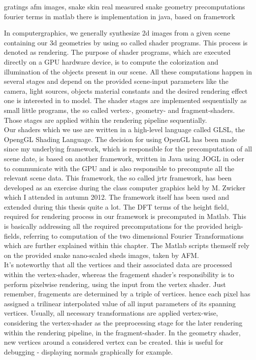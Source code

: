 gratings afm images, snake skin
real measured snake geometry
precomputations fourier terms in matlab
there is implementation in java, based on framework

















In computergraphics, we generally synthesize 2d images from a given scene containing our 3d geometries by using so called shader programs. This process is denoted as rendering. The purpose of shader programs, which are executed directly on a GPU hardware device, is to compute the colorization and illumination of the objects present in our scene. All these computations happen in several stages and depend on the provided scene-input parameters like the camera, light sources, objects material constants and the desired rendering effect one is interested in to model. The shader stages are implemented sequentially as small little programs, the so called vertex-, geometry- and fragment-shaders. Those stages are applied within the rendering pipeline sequentially. \\

Our shaders which we use are written in a high-level language called GLSL, the OpengGL Shading Language. The decision for using OpenGL has been made since my underlying framework, which is responsible for the precomputation of all scene date, is based on another framework, written in Java using JOGL in oder to communicate with the GPU and is also responsible to precompute all the relevant scene data. This framework, the so called jrtr framework, has been developed as an exercise during the class computer graphics held by M. Zwicker which I attended in autumn 2012. The framework itself has been used and extended during this thesis quite a lot. The DFT terms of the height field, required for rendering process in our framework is precomputed in Matlab. This is basically addressing all the required precomputations for the provided heigh-fields, referring to computation of the two dimensional Fourier Transformations which are further explained within this chapter. The Matlab scripts themself rely on the provided snake nano-scaled sheds images, taken by AFM. \\

It's noteworthy that all the vertices and their associated data are processed within the vertex-shader, whereas the fragement shader's responsibility is to perform pixelwise rendering, using the input from the vertex shader. Just remember, fragements are determined by a triple of vertices. hence each pixel has assigned a trilinear interpolated value of all input parameters of its spanning vertices. Usually, all necessary transformations are applied vertex-wise, considering the vertex-shader as the preprocessing stage for the later rendering within the rendering pipeline, in the fragment-shader. In the geometry shader, new vertices around a considered vertex can be created. this is useful for debugging - displaying normals graphically for example. \\

